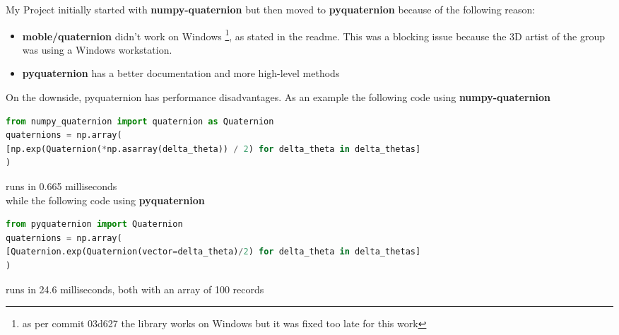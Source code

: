 My Project initially started with \textbf{numpy-quaternion} \cite{numpy-quaternion} but then moved to \textbf{pyquaternion} \cite{pyquaternion} because of the following reason:
\begin{itemize}
\item \textbf{moble/quaternion} didn't work on Windows \footnote{ as per commit 03d627 the library works on Windows but it was fixed too late for this work}, as stated in the readme. This was a blocking issue because the 3D artist of the group was using a Windows workstation.
\item \textbf{pyquaternion} has a better documentation and more high-level methods
\end{itemize}

On the downside, pyquaternion has performance disadvantages. As an example the following code using \textbf{numpy-quaternion}
\begin{changemargin}{-1cm}{-1cm}
\begin{lstlisting}[language=Python,frame=single]
from numpy_quaternion import quaternion as Quaternion
quaternions = np.array(
[np.exp(Quaternion(*np.asarray(delta_theta)) / 2) for delta_theta in delta_thetas]
)
\end{lstlisting}
\end{changemargin}
runs in 0.665 milliseconds \\
while the following code using \textbf{pyquaternion} 
\begin{changemargin}{-1cm}{-1cm}
\begin{lstlisting}[language=Python,frame=single]
from pyquaternion import Quaternion
quaternions = np.array(
[Quaternion.exp(Quaternion(vector=delta_theta)/2) for delta_theta in delta_thetas]
)
\end{lstlisting}
\end{changemargin}
runs in 24.6 milliseconds, both with an array of 100 records